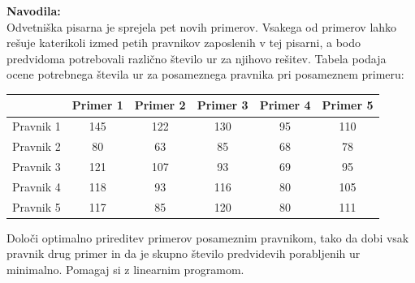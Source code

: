 \documentclass[a4paper,11pt]{article}
\begin{document}
\textbf{Navodila:}\\
Odvetniška pisarna je sprejela pet novih primerov. Vsakega od primerov lahko rešuje katerikoli izmed petih pravnikov zaposlenih v tej pisarni, a bodo predvidoma
potrebovali različno število ur za njihovo rešitev. Tabela podaja ocene potrebnega števila ur za posameznega pravnika pri posameznem primeru:
\begin{table}[hbt] \centering
\begin{tabular}{| l | c | c | c | c | c |}
\hline 
 & Primer 1 & Primer 2 & Primer 3 & Primer 4 & Primer 5 \\
 \hline
 Pravnik 1 & 145 & 122 & 130 & 95 & 110 \\
 \hline
 Pravnik 2 & 80 & 63 & 85 & 68 & 78 \\
 \hline
 Pravnik 3 & 121 & 107 & 93 & 69 & 95 \\
 \hline
 Pravnik 4 & 118 & 93 & 116 & 80 & 105 \\
 \hline
 Pravnik 5 & 117 & 85 & 120 & 80 & 111 \\
 \hline
\end{tabular}
\end{table}
Določi optimalno prireditev primerov posameznim pravnikom, tako da dobi vsak pravnik drug primer in da je skupno število predvidevih porabljenih ur minimalno. Pomagaj si z linearnim programom.
\end{document}
